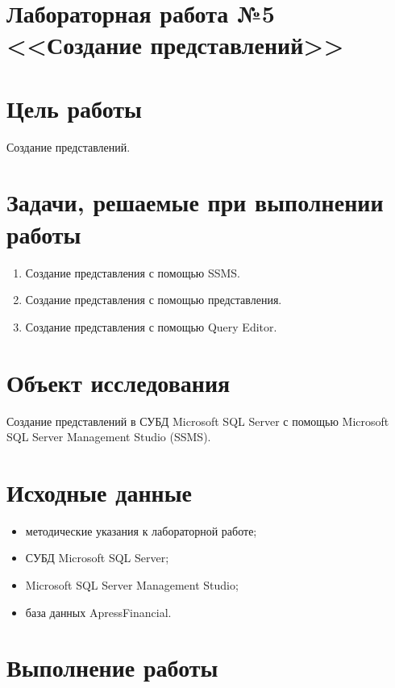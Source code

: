 \documentclass[a4paper, 14pt]{extarticle}
\begin{document}
\setcounter{page}{2}

\linespread{1.5}
\renewcommand{\baselinestretch}{1.5}

\section*{\large{Лабораторная работа №5 <<Создание представлений>>}}

\section{Цель работы}

Создание представлений.

\section{Задачи, решаемые при выполнении работы}

\begin{enumerate}[leftmargin=*]
  \item Создание представления с помощью SSMS.
  \item Создание представления с помощью представления.
  \item Создание представления с помощью Query Editor.
\end{enumerate}

\section{Объект исследования}

Создание представлений в СУБД \foreignlanguage{english}{Microsoft SQL Server} с
помощью \foreignlanguage{english}{Microsoft SQL Server Management Studio
  (SSMS)}.

\section{Исходные данные}

\begin{itemize}
  \item методические указания к лабораторной работе;
  \item СУБД Microsoft SQL Server;
  \item Microsoft SQL Server Management Studio;
  \item база данных ApressFinancial.
\end{itemize}

\section{Выполнение работы}
\end{document}
